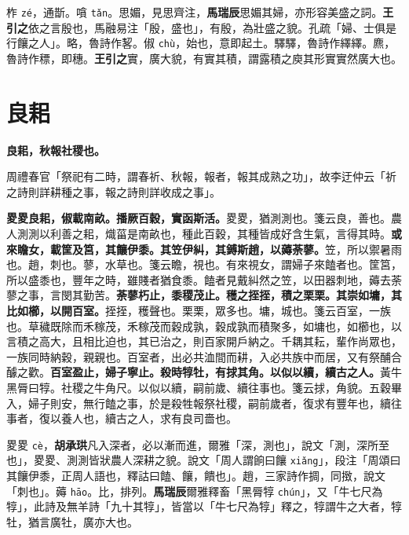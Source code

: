 \begin{quoting}柞 \texttt{zé}，通斮。嗿 \texttt{tǎn}。思媚，見思齊注，\textbf{馬瑞辰}思媚其婦，亦形容美盛之詞。\textbf{王引之}依之言殷也，馬融易注「殷，盛也」，有殷，為壯盛之貌。孔疏「婦、士俱是行饟之人」。略，魯詩作㗉。俶 \texttt{chù}，始也，意即起土。驛驛，魯詩作繹繹。麃，魯詩作䅺，即穗。\textbf{王引之}實，廣大貌，有實其積，謂露積之庾其形實實然廣大也。\end{quoting}

\section{良耜}


\textbf{良耜，秋報社稷也。}

\begin{quoting}周禮春官「祭祀有二時，謂春祈、秋報，報者，報其成熟之功」，故李迂仲云「祈之詩則詳耕種之事，報之詩則詳收成之事」。\end{quoting}

\textbf{畟畟良耜，俶載南畝。播厥百穀，實函斯活。}{\footnotesize 畟畟，猶測測也。箋云良，善也。農人測測以利善之耜，熾菑是南畝也，種此百穀，其種皆成好含生氣，言得其時。}\textbf{或來瞻女，載筐及筥，其饟伊黍。其笠伊糾，其鎛斯趙，以薅荼蓼。}{\footnotesize 笠，所以禦暑雨也。趙，刺也。蓼，水草也。箋云瞻，視也。有來視女，謂婦子來饁者也。筐筥，所以盛黍也，豐年之時，雖賤者猶食黍。饁者見戴糾然之笠，以田器刺地，薅去荼蓼之事，言閔其勤苦。}\textbf{荼蓼朽止，黍稷茂止。穫之挃挃，積之栗栗。其崇如墉，其比如櫛，以開百室。}{\footnotesize 挃挃，穫聲也。栗栗，眾多也。墉，城也。箋云百室，一族也。草穢既除而禾稼茂，禾稼茂而穀成孰，穀成孰而積聚多，如墉也，如櫛也，以言積之高大，且相比迫也，其已治之，則百家開戶納之。千耦其耘，輩作尚眾也，一族同時納穀，親親也。百室者，出必共洫間而耕，入必共族中而居，又有祭酺合醵之歡。}\textbf{百室盈止，婦子寧止。殺時犉牡，有捄其角。以似以續，續古之人。}{\footnotesize 黃牛黑脣曰犉。社稷之牛角尺。以似以續，嗣前歲、續往事也。箋云捄，角貌。五穀畢入，婦子則安，無行饁之事，於是殺牲報祭社稷，嗣前歲者，復求有豐年也，續往事者，復以養人也，續古之人，求有良司嗇也。}

\begin{quoting}畟畟 \texttt{cè}，\textbf{胡承珙}凡入深者，必以漸而進，爾雅「深，測也」，說文「測，深所至也」，畟畟、測測皆狀農人深耕之貌。說文「周人謂餉曰饟 \texttt{xiǎng}」，段注「周頌曰其饟伊黍，正周人語也，釋詁曰饁、饟，饋也」。趙，三家詩作㨄，同㨖，說文「刺也」。薅 \texttt{hāo}。比，排列。\textbf{馬瑞辰}爾雅釋畜「黑脣犉 \texttt{chún}」，又「牛七尺為犉」，此詩及無羊詩「九十其犉」，皆當以「牛七尺為犉」釋之，犉謂牛之大者，犉牡，猶言廣牡，廣亦大也。\end{quoting}

